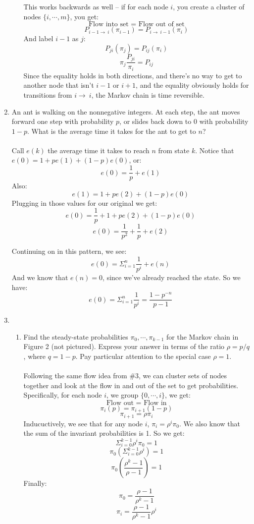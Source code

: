 \begin{enumerate}
\begin{enumerate}
        This works backwards as well -- if for each node $i$, you create a cluster of nodes $\{i, \cdots, m\}$, you get:
        $$\text{Flow into set = Flow out of set}$$
        $$P_{i-1 \to\ i} (\pi_{i-1}) = P_{i \to\ i-1} (\pi_{i})$$
        And label $i-1$ as $j$:
        $$P_{ji} (\pi_{j}) = P_{ij} (\pi_{i})$$
        $$\pi_j \frac{P_{ji}}{\pi_{i}} = P_{ij}$$
        Since the equality holds in both directions, and there's no way to get to another node that isn't $i-1$ or $i+1$, and the equality obviously holds for transitions from $i \to\ i$, the Markov chain is time reversible.
        
    \end{enumerate}

  \item An ant is walking on the nonnegative integers. At each step, the ant moves forward one step with probability $p$, or slides back down to $0$ with probability $1-p$. What is the average time it takes for the ant to get to $n$?\\\\

    Call $e(k)$ the average time it takes to reach $n$ from state $k$. Notice that $e(0) = 1 + pe(1) + (1-p)e(0)$, or:
    $$e(0) = \frac{1}{p} + e(1)$$
    Also:
    $$e(1) = 1 + pe(2) + (1-p)e(0)$$
    Plugging in those values for our original we get:
    $$e(0) = \frac{1}{p} + 1 + pe(2) + (1-p)e(0)$$
    $$e(0) = \frac{1}{p^2} + \frac{1}{p} + e(2)$$

    Continuing on in this pattern, we see:
    $$e(0) = \Sigma_{i=1}^n \frac{1}{p^i} + e(n)$$
    And we know that $e(n) = 0$, since we've already reached the state. So we have:
    $$e(0) = \Sigma_{i=1}^n \frac{1}{p^i} = \frac{1-p^{-n}}{p-1}$$

  \item 
    \begin{enumerate}
      \item Find the steady-state probabilities $\pi_0, \cdots, \pi_{k-1}$ for the Markov chain in Figure 2 (not pictured). Express your answer in terms of the ratio $\rho = p/q$, where $q = 1-p$. Pay particular attention to the special case $\rho = 1$.\\\\

        Following the same flow idea from \#3, we can cluster sets of nodes together and look at the flow in and out of the set to get probabilities. Specifically, for each node $i$, we group $\{0, \cdots, i\}$, we get:
        $$\text{Flow out = Flow in}$$
        $$\pi_i (p) = \pi_{i+1} (1-p)$$
        $$\pi_{i+1} = \rho \pi_i$$
        Inducuctively, we see that for any node $i$, $\pi_i = \rho^i \pi_0$. We also know that the sum of the invariant probabilities is 1. So we get:
        $$\Sigma_{i=0}^{k-1} \rho^i \pi_0  = 1$$
        $$\pi_0 (\Sigma_{i=0}^{k-1} \rho^i) = 1$$
        $$\pi_0 (\frac{\rho^k-1}{\rho-1}) = 1$$
        Finally:
        $$\pi_0 = \frac{\rho-1}{\rho^k - 1}$$
        $$\pi_i = \frac{\rho-1}{\rho^k - 1} \rho^i$$


\end{enumerate}
\end{enumerate}
